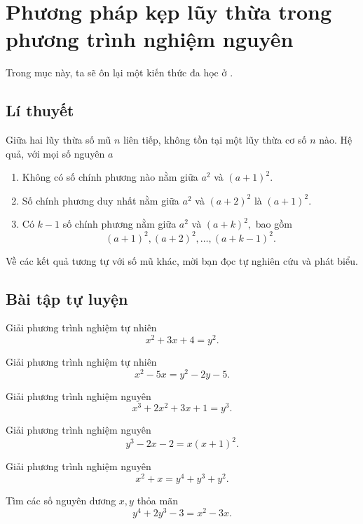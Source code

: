 \section{Phương pháp kẹp lũy thừa trong phương trình nghiệm nguyên}
Trong mục này, ta sẽ ôn lại một kiến thức đa học ở .
\subsection*{Lí thuyết}
 Giữa hai lũy thừa số mũ $n$ liên tiếp, không tồn tại một lũy thừa cơ số $n$ nào. Hệ quả, với mọi số nguyên $a$ 
    \begin{enumerate}
        \item Không có số chính phương nào nằm giữa $a^2$ và $\left(a+1\right)^2.$
        \item Số chính phương duy nhất nằm giữa $a^2$ và $\left(a+2\right)^2$ là $\left(a+1\right)^2.$    
        \item Có $k-1$ số chính phương nằm giữa $a^2$ và $\left(a+k\right)^2,$ bao gồm \[\left(a+1\right)^2,\left(a+2\right)^2,\ldots,\left(a+k-1\right)^2.\]         
    \end{enumerate}
    Về các kết quả tương tự với số mũ khác, mời bạn đọc tự nghiên cứu và phát biểu.
\subsection*{Bài tập tự luyện}

\begin{btt}
Giải phương trình nghiệm tự nhiên
$$x^2+3x+4=y^2.$$
\end{btt}

\begin{btt}
Giải phương trình nghiệm tự nhiên
$$x^2-5x=y^2-2y-5.$$
\end{btt}

\begin{btt}
Giải phương trình nghiệm nguyên
$$x^3+2x^2+3x+1=y^3.$$
\end{btt}
\begin{btt}
Giải phương trình nghiệm nguyên $$y^{3}-2 x-2=x(x+1)^2.$$
\end{btt}

\begin{btt}
Giải phương trình nghiệm nguyên
$$x^2+x=y^4+y^3+y^2.$$
\end{btt}

\begin{btt} 
Tìm các số nguyên dương $x,y$ thỏa mãn
$$y^4+2y^3-3=x^2-3x.$$
\end{btt} %

